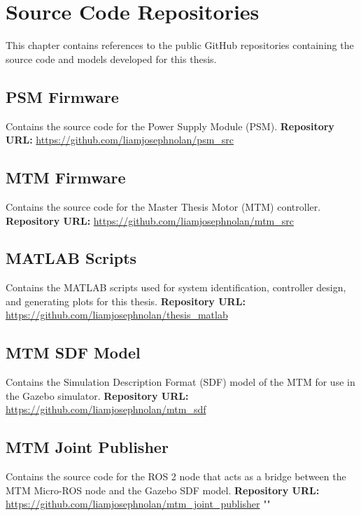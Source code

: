 \chapter{Source Code Repositories}
\label{chap:source_code}

This chapter contains references to the public GitHub repositories containing the source code and models developed for this thesis.

\section{PSM Firmware}
\label{sec:psm_src}
Contains the source code for the Power Supply Module (PSM).
\vspace{0.5cm}
\textbf{Repository URL:} \url{https://github.com/liamjosephnolan/psm_src}

\section{MTM Firmware}
\label{sec:mtm_src}
Contains the source code for the Master Thesis Motor (MTM) controller.
\vspace{0.5cm}
\textbf{Repository URL:} \url{https://github.com/liamjosephnolan/mtm_src}

\section{MATLAB Scripts}
\label{sec:matlab_scripts}
Contains the MATLAB scripts used for system identification, controller design, and generating plots for this thesis.
\vspace{0.5cm}
\textbf{Repository URL:} \url{https://github.com/liamjosephnolan/thesis_matlab}

\section{MTM SDF Model}
\label{sec:mtm_sdf}
Contains the Simulation Description Format (SDF) model of the MTM for use in the Gazebo simulator.
\vspace{0.5cm}
\textbf{Repository URL:} \url{https://github.com/liamjosephnolan/mtm_sdf}

\section{MTM Joint Publisher}
\label{sec:mtm_joint_publisher}
Contains the source code for the ROS 2 node that acts as a bridge between the MTM Micro-ROS node and the Gazebo SDF model.
\vspace{0.5cm}
\textbf{Repository URL:} \url{https://github.com/liamjosephnolan/mtm_joint_publisher}
""